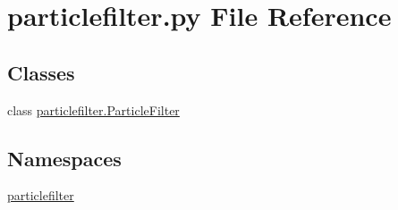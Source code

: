 \section{particlefilter.\+py File Reference}
\label{particlefilter_8py}
\subsection*{Classes}
\begin{DoxyCompactItemize}
\item 
class \hyperlink{classparticlefilter_1_1ParticleFilter}{particlefilter.\+Particle\+Filter}
\end{DoxyCompactItemize}
\subsection*{Namespaces}
\begin{DoxyCompactItemize}
\item 
 \hyperlink{namespaceparticlefilter}{particlefilter}
\end{DoxyCompactItemize}
